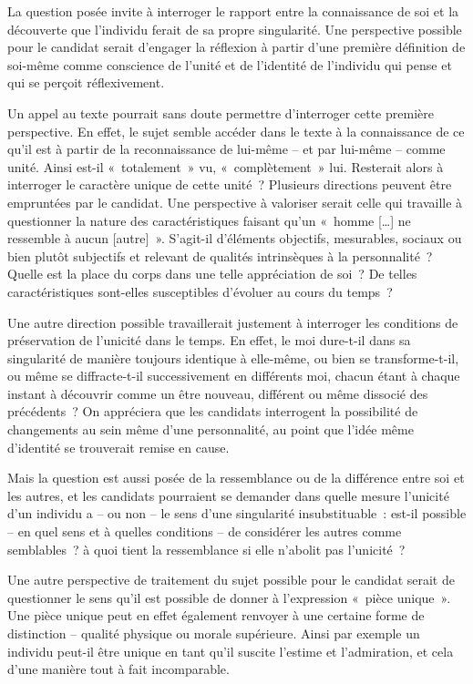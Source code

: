 {La question posée invite à interroger le rapport entre la connaissance de soi et la
découverte que l'individu ferait de sa propre singularité. Une perspective possible pour
le candidat serait d'engager la réflexion à partir d'une première définition de soi-même
comme conscience de l'unité et de l'identité de l'individu qui pense et qui se perçoit
réflexivement.

Un appel au texte pourrait sans doute permettre d'interroger cette première
perspective. En effet, le sujet semble accéder dans le texte à la connaissance de ce
qu'il est à partir de la reconnaissance de lui-même – et par lui-même – comme unité.
Ainsi est-il «~totalement~» vu, «~complètement~» lui. Resterait alors à interroger le
caractère unique de cette unité~?
Plusieurs directions peuvent être empruntées par le candidat. Une perspective à
valoriser serait celle qui travaille à questionner la nature des caractéristiques faisant
qu'un «~homme […] ne ressemble à aucun [autre]~». S'agit-il d'éléments objectifs,
mesurables, sociaux ou bien plutôt subjectifs et relevant de qualités intrinsèques à la
personnalité~? Quelle est la place du corps dans une telle appréciation de soi~? De
telles caractéristiques sont-elles susceptibles d'évoluer au cours du temps~?

Une autre direction possible travaillerait justement à interroger les conditions de
préservation de l'unicité dans le temps. En effet, le moi dure-t-il dans sa singularité de
manière toujours identique à elle-même, ou bien se transforme-t-il, ou même se
diffracte-t-il successivement en différents moi, chacun étant à chaque instant à
découvrir comme un être nouveau, différent ou même dissocié des précédents~? On appréciera que les candidats interrogent la possibilité de changements au sein même
d'une personnalité, au point que l'idée même d'identité se trouverait remise en cause.

Mais la question est aussi posée de la ressemblance ou de la différence entre soi et
les autres, et les candidats pourraient se demander dans quelle mesure l'unicité d'un
individu a – ou non – le sens d'une singularité insubstituable~: est-il possible – en quel
sens et à quelles conditions – de considérer les autres comme semblables~? à quoi
tient la ressemblance si elle n'abolit pas l'unicité~?

Une autre perspective de traitement du sujet possible pour le candidat serait de
questionner le sens qu'il est possible de donner à l'expression «~pièce unique~». Une
pièce unique peut en effet également renvoyer à une certaine forme de distinction –
qualité physique ou morale supérieure. Ainsi par exemple un individu peut-il être
unique en tant qu'il suscite l'estime et l'admiration, et cela d'une manière tout à fait
incomparable.

}

